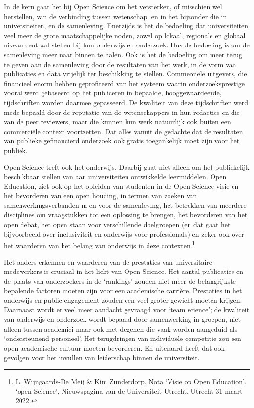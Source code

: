 \documentclass[empirical, authordate, ]{new-jote-article}
\begin{document}
	In de kern gaat het bij Open Science om het versterken, of misschien wel herstellen, van de verbinding tussen wetenschap, en in het bijzonder die in universiteiten, en de samenleving. Enerzijds is het de bedoeling dat universiteiten veel meer de grote maatschappelijke noden, zowel op lokaal, regionale en globaal niveau centraal stellen bij hun onderwijs en onderzoek. Dus de bedoeling is om de samenleving meer naar binnen te halen. Ook is het de bedoeling om meer terug te geven aan de samenleving door de resultaten van het werk, in de vorm van publicaties en data vrijelijk ter beschikking te stellen. Commerciële uitgevers, die financieel enorm hebben geprofiteerd van het systeem waarin onderzoeksprestige vooral werd gebaseerd op het publiceren in bepaalde, hooggewaardeerde, tijdschriften worden daarmee gepasseerd. De kwaliteit van deze tijdschriften werd mede bepaald door de reputatie van de wetenschappers in hun redacties en die van de peer reviewers, maar die kunnen hun werk natuurlijk ook buiten een commerciële context voortzetten. Dat alles vanuit de gedachte dat de resultaten van publieke gefinancierd onderzoek ook gratis toegankelijk moet zijn voor het publiek.



	Open Science treft ook het onderwijs. Daarbij gaat niet alleen om het publiekelijk beschikbaar stellen van aan universiteiten ontwikkelde leermiddelen. Open Education, ziet ook op het opleiden van studenten in de Open Science-visie en het bevorderen van een open houding, in termen van zoeken van samenwerkingsverbanden in en voor de samenleving, het betrekken van meerdere disciplines om vraagstukken tot een oplossing te brengen, het bevorderen van het open debat, het open staan voor verschillende doelgroepen (en dat gaat het bijvoorbeeld over inclusiviteit en onderwijs voor professionals) en zeker ook over het waarderen van het belang van onderwijs in deze contexten.\footnote{L. Wijngaards-De Meij \& Kim Zunderdorp, Nota ‘Visie op Open Education', ‘open Science', Nieuwspagina van de Universiteit Utrecht. Utrecht 31 maart 2022. }



	Het anders erkennen en waarderen van de prestaties van universitaire medewerkers is cruciaal in het licht van Open Science. Het aantal publicaties en de plaats van onderzoekers in de ‘rankings' zouden niet meer de belangrijkste bepalende factoren moeten zijn voor een academische carrière. Prestaties in het onderwijs en public engagement zouden een veel groter gewicht moeten krijgen. Daarnaast wordt er veel meer aandacht gevraagd voor ‘team science'; de kwaliteit van onderwijs en onderzoek wordt bepaald door samenwerking in groepen, niet alleen tussen academici maar ook met degenen die vaak worden aangeduid als ‘ondersteunend personeel'. Het terugdringen van individuele competitie zou een open academische cultuur moeten bevorderen. En uiteraard heeft dat ook gevolgen voor het invullen van leiderschap binnen de universiteit.
\end{document}
